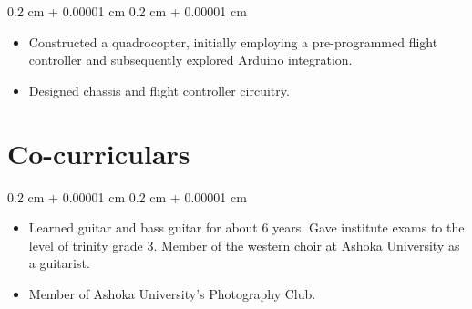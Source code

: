 \documentclass[10pt, letterpaper]{article}
\newenvironment{highlights}{
    \begin{itemize}[
        topsep=0.10 cm,
        parsep=0.10 cm,
        partopsep=0pt,
        itemsep=0pt,
        leftmargin=0.4 cm + 10pt
    ]
}{
    \end{itemize}
} %
\newenvironment{onecolentry}{
    \begin{adjustwidth}{
        0.2 cm + 0.00001 cm
    }{
        0.2 cm + 0.00001 cm
    }
}{
    \end{adjustwidth}
} %
\begin{document}
        \vspace{0.10 cm}
        \begin{onecolentry}
            \begin{highlights}
                \item Constructed a quadrocopter, initially employing a pre-programmed flight controller and subsequently explored Arduino integration.
                \item Designed chassis and flight controller circuitry.
            \end{highlights}
        \end{onecolentry}
    
    \section{Co-curriculars}

        \begin{onecolentry}
            \begin{highlights}
                \item Learned guitar and bass guitar for about 6 years. Gave institute exams to the level of trinity grade 3. Member of the western choir at Ashoka University as a guitarist.
                \item Member of Ashoka University's Photography Club.
            \end{highlights}
        \end{onecolentry}


    
\end{document}

